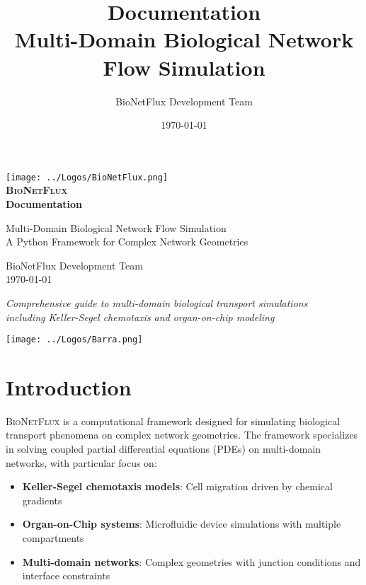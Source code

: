 \documentclass[11pt,a4paper]{article}
\title{\Huge {\textbf{\bionetflux{} Documentation}} \\[0.5cm]
       \Large Multi-Domain Biological Network Flow Simulation}
\author{BioNetFlux Development Team}
\date{\today}
\newcommand{\bionetflux}{\textsc{BioNetFlux}}
\begin{document}
\begin{titlepage}
    \centering
    
    \texttt{[image: ../Logos/BioNetFlux.png]}\\[1cm]
    
    {\Huge \textbf{\bionetflux{}} \\[0.5cm]}
    {\Large \textbf{Documentation} \\[1cm]}
    
    {\large Multi-Domain Biological Network Flow Simulation \\[0.5cm]}
    {\large A Python Framework for Complex Network Geometries \\[2cm]}

    
    {\Large BioNetFlux Development Team \\[0.5cm]}
    {\large \today}
    
    \vfill
    
    {\footnotesize 
    \textit{Comprehensive guide to multi-domain biological transport simulations} \\
    \textit{including Keller-Segel chemotaxis and organ-on-chip modeling}
    }
        
        \vskip3cm
        
    \texttt{[image: ../Logos/Barra.png]}\\[2cm]
\end{titlepage}

\tableofcontents
\clearpage

\section{Introduction}

\bionetflux{} is a computational framework designed for simulating biological transport phenomena on complex network geometries. The framework specializes in solving coupled partial differential equations (PDEs) on multi-domain networks, with particular focus on:

\begin{itemize}
    \item \textbf{Keller-Segel chemotaxis models}: Cell migration driven by chemical gradients
    \item \textbf{Organ-on-Chip systems}: Microfluidic device simulations with multiple compartments
    \item \textbf{Multi-domain networks}: Complex geometries with junction conditions and interface constraints
\end{itemize}
\end{document}
